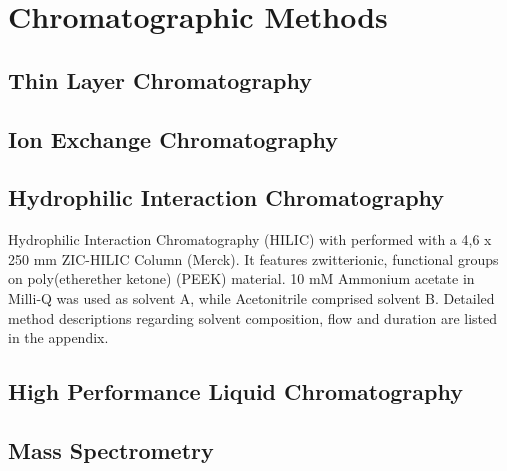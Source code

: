 
\section{Chromatographic Methods} %
\label{sec:chromatographic_methods}



\subsection{Thin Layer Chromatography} %
\label{sub:thin_layer_chromatography}


\subsection{Ion Exchange Chromatography} %
\label{sub:ion_exchange_chromatography}


\subsection{Hydrophilic Interaction Chromatography} %
\label{sub:hilic}

Hydrophilic Interaction Chromatography (HILIC) with performed with a 4,6 x 250 mm ZIC-HILIC Column (Merck). It features zwitterionic, functional groups on poly(etherether ketone) (PEEK) material.
10 mM Ammonium acetate in Milli-Q  was used as solvent A, while Acetonitrile comprised solvent B. Detailed method descriptions regarding solvent composition, flow and duration are listed in the appendix.


\subsection{High Performance Liquid Chromatography} %
\label{sub:hplc}


\subsection{Mass Spectrometry} %
\label{sub:mass_spectrometry}

